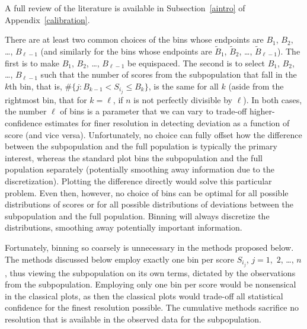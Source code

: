 \documentclass{article}
\begin{document}
A full review of the literature is available in Subsection~\ref{aintro}
of Appendix~\ref{calibration}.

There are at least two common choices of the bins
whose endpoints are $B_1$, $B_2$, \dots, $B_{\ell-1}$
(and similarly for the bins whose endpoints are
$\tilde{B}_1$, $\tilde{B}_2$, \dots, $\tilde{B}_{\ell-1}$).
The first is to make $B_1$, $B_2$, \dots, $B_{\ell-1}$ be equispaced.
The second is to select $B_1$, $B_2$, \dots, $B_{\ell-1}$ such that
the number of scores from the subpopulation that fall in the $k$th bin,
that is, $\#\{j : B_{k-1} < S_{i_j} \le B_k\}$, is the same for all $k$
(aside from the rightmost bin, that for $k = \ell$,
if $n$ is not perfectly divisible by $\ell$).
In both cases, the number $\ell$ of bins is a parameter that we can vary
to trade-off higher-confidence estimates for finer resolution
in detecting deviation as a function of score (and vice versa).
Unfortunately, no choice can fully offset how the difference between
the subpopulation and the full population is typically the primary interest,
whereas the standard plot bins the subpopulation and the full population
separately (potentially smoothing away information due to the discretization).
Plotting the difference directly would solve this particular problem.
Even then, however, no choice of bins can be optimal
for all possible distributions of scores or for all possible distributions
of deviations between the subpopulation and the full population.
Binning will always discretize the distributions,
smoothing away potentially important information.

Fortunately, binning so coarsely is unnecessary in the methods proposed below.
The methods discussed below employ exactly one bin per score $S_{i_j}$,
$j = 1$,~$2$, \dots, $n$, thus viewing the subpopulation on its own terms,
dictated by the observations from the subpopulation.
Employing only one bin per score would be nonsensical in the classical plots,
as then the classical plots would trade-off all statistical confidence
for the finest resolution possible.
The cumulative methods sacrifice no resolution that is available
in the observed data for the subpopulation.
\end{document}
